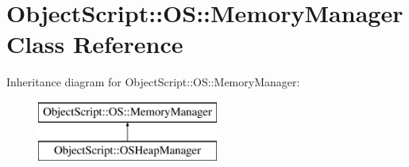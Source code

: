 \hypertarget{class_object_script_1_1_o_s_1_1_memory_manager}{}\section{Object\+Script\+:\+:OS\+:\+:Memory\+Manager Class Reference}
\label{class_object_script_1_1_o_s_1_1_memory_manager}
Inheritance diagram for Object\+Script\+:\+:OS\+:\+:Memory\+Manager\+:\begin{figure}[H]
\begin{center}
\leavevmode
\includegraphics[height=2.000000cm]{class_object_script_1_1_o_s_1_1_memory_manager}
\end{center}
\end{figure}
